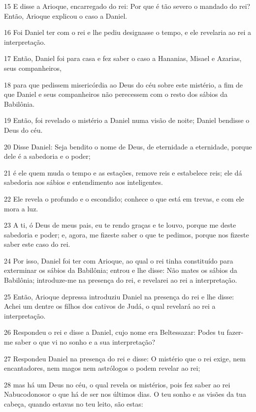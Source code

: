 \par 15 E disse a Arioque, encarregado do rei: Por que é tão severo o mandado do rei? Então, Arioque explicou o caso a Daniel.
\par 16 Foi Daniel ter com o rei e lhe pediu designasse o tempo, e ele revelaria ao rei a interpretação.
\par 17 Então, Daniel foi para casa e fez saber o caso a Hananias, Misael e Azarias, seus companheiros,
\par 18 para que pedissem misericórdia ao Deus do céu sobre este mistério, a fim de que Daniel e seus companheiros não perecessem com o resto dos sábios da Babilônia.
\par 19 Então, foi revelado o mistério a Daniel numa visão de noite; Daniel bendisse o Deus do céu.
\par 20 Disse Daniel: Seja bendito o nome de Deus, de eternidade a eternidade, porque dele é a sabedoria e o poder;
\par 21 é ele quem muda o tempo e as estações, remove reis e estabelece reis; ele dá sabedoria aos sábios e entendimento aos inteligentes.
\par 22 Ele revela o profundo e o escondido; conhece o que está em trevas, e com ele mora a luz.
\par 23 A ti, ó Deus de meus pais, eu te rendo graças e te louvo, porque me deste sabedoria e poder; e, agora, me fizeste saber o que te pedimos, porque nos fizeste saber este caso do rei.
\par 24 Por isso, Daniel foi ter com Arioque, ao qual o rei tinha constituído para exterminar os sábios da Babilônia; entrou e lhe disse: Não mates os sábios da Babilônia; introduze-me na presença do rei, e revelarei ao rei a interpretação.
\par 25 Então, Arioque depressa introduziu Daniel na presença do rei e lhe disse: Achei um dentre os filhos dos cativos de Judá, o qual revelará ao rei a interpretação.
\par 26 Respondeu o rei e disse a Daniel, cujo nome era Beltessazar: Podes tu fazer-me saber o que vi no sonho e a sua interpretação?
\par 27 Respondeu Daniel na presença do rei e disse: O mistério que o rei exige, nem encantadores, nem magos nem astrólogos o podem revelar ao rei;
\par 28 mas há um Deus no céu, o qual revela os mistérios, pois fez saber ao rei Nabucodonosor o que há de ser nos últimos dias. O teu sonho e as visões da tua cabeça, quando estavas no teu leito, são estas:
